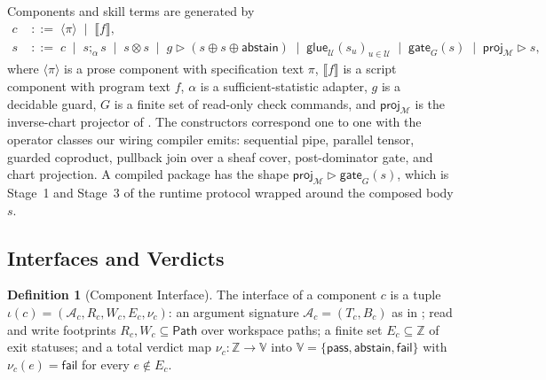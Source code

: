 \documentclass[11pt]{article}
\theoremstyle{definition}
\newtheorem{definition}{Definition}
\theoremstyle{plain}
\newcommand{\Ucal}{\mathcal{U}}
\newcommand{\Mcal}{\mathcal{M}}
\newcommand{\Acal}{\mathcal{A}}
\newcommand{\pass}{\mathsf{pass}}
\newcommand{\abst}{\mathsf{abstain}}
\newcommand{\fail}{\mathsf{fail}}
\newcommand{\Vset}{\mathbb{V}}
\newcommand{\prose}[1]{\langle #1 \rangle}
\newcommand{\script}[1]{\llbracket #1 \rrbracket}
\newcommand{\seqc}{\mathbin{;}}
\newcommand{\gate}{\mathsf{gate}}
\newcommand{\proj}{\mathsf{proj}}
\newcommand{\glue}{\mathsf{glue}}
\newcommand{\Paths}{\mathsf{Path}}
\begin{document}
Components and skill terms are generated by
\begin{align*}
  c &\;::=\; \prose{\pi} \;\mid\; \script{f}, \\
  s &\;::=\; c \;\mid\; s \seqc_\alpha s \;\mid\; s \otimes s \;\mid\; g \triangleright (s \oplus s \oplus \abst) \;\mid\; \glue_{\Ucal}(s_u)_{u \in \Ucal} \;\mid\; \gate_G(s) \;\mid\; \proj_{\Mcal} \triangleright s,
\end{align*}
where $\prose{\pi}$ is a prose component with specification text $\pi$, $\script{f}$ is a script component with program text $f$, $\alpha$ is a sufficient-statistic adapter, $g$ is a decidable guard, $G$ is a finite set of read-only check commands, and $\proj_{\Mcal}$ is the inverse-chart projector of . The constructors correspond one to one with the operator classes our wiring compiler emits: sequential pipe, parallel tensor, guarded coproduct, pullback join over a sheaf cover, post-dominator gate, and chart projection. A compiled package has the shape $\proj_{\Mcal} \triangleright \gate_G(s)$, which is Stage~1 and Stage~3 of the runtime protocol wrapped around the composed body $s$.

\subsection{Interfaces and Verdicts}
\label{subsec:interfaces}

\begin{definition}[Component Interface]
\label{def:interface}
The interface of a component $c$ is a tuple $\iota(c) = (\Acal_c, R_c, W_c, E_c, \nu_c)$: an argument signature $\Acal_c = (T_c, B_c)$ as in ; read and write footprints $R_c, W_c \subseteq \Paths$ over workspace paths; a finite set $E_c \subseteq \mathbb{Z}$ of exit statuses; and a total verdict map $\nu_c : \mathbb{Z} \to \Vset$ into $\Vset = \{\pass, \abst, \fail\}$ with $\nu_c(e) = \fail$ for every $e \notin E_c$.
\end{definition}
\end{document}
